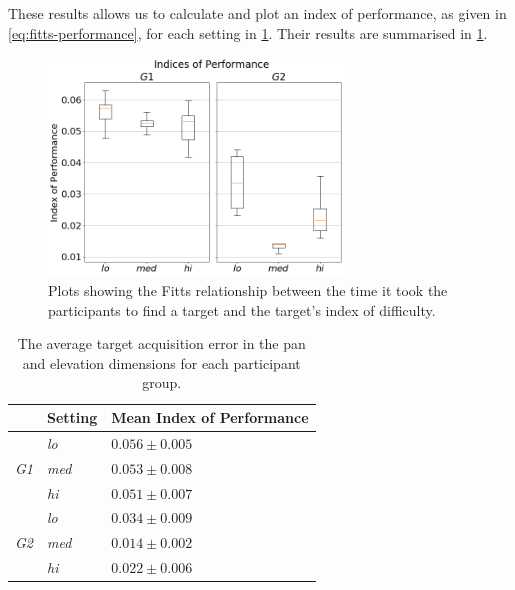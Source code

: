 \documentclass[]{interact}
\begin{document}
These results allows us to calculate and plot an index of performance, as given in \cref{eq:fitts-performance}, for each setting in \cref{fig:fitts-ips}.
Their results are summarised in \cref{tab:fitts-results}.

\begin{figure}
  \centering
  \includegraphics[width=0.7\textwidth]{figures/fitts_ips.png}
  \caption{Plots showing the Fitts relationship between the time it took the participants to find a target and the target's index of difficulty. }\label{fig:fitts-ips}
\end{figure}

\begin{table}
  \centering
  \caption{The average target acquisition error in the pan and elevation dimensions for each participant group. }\label{tab:fitts-results}
  \begin{tabular}{p{0.5cm}p{1.2cm}p{2.3cm}}
    \toprule
    & Setting      & Mean Index of Performance \\ \midrule
    & \textit{lo}  & $0.056\pm0.005$ \\
    \textit{G1} & \textit{med} & $0.053\pm0.008$ \\
		& \textit{hi}  & $0.051\pm0.007$ \\ \cline{2-3}
    & \textit{lo}  & $0.034\pm0.009$ \\
    \textit{G2} & \textit{med} & $0.014\pm0.002$ \\
    & \textit{hi}  & $0.022\pm0.006$ \\
    \bottomrule
  \end{tabular}
\end{table}
\end{document}
